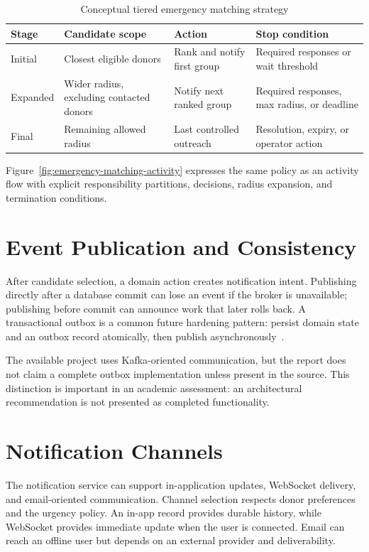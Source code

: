 \begin{table}[H]
\centering\small
\begin{tabularx}{\textwidth}{|P{2.3cm}|P{3.1cm}|Y|Y|}
\hline
{}\textbf{Stage} & \textbf{Candidate scope} & \textbf{Action} & \textbf{Stop condition}\\ \hline
Initial & Closest eligible donors & Rank and notify first group & Required responses or wait threshold\\ \hline
Expanded & Wider radius, excluding contacted donors & Notify next ranked group & Required responses, max radius, or deadline\\ \hline
Final & Remaining allowed radius & Last controlled outreach & Resolution, expiry, or operator action\\ \hline
\end{tabularx}
\caption{Conceptual tiered emergency matching strategy}
\label{tab:matching-tiers}
\end{table}

Figure~\ref{fig:emergency-matching-activity} expresses the same policy as an activity flow with explicit responsibility partitions, decisions, radius expansion, and termination conditions.


\section{Event Publication and Consistency}
After candidate selection, a domain action creates notification intent. Publishing directly after a database commit can lose an event if the broker is unavailable; publishing before commit can announce work that later rolls back. A transactional outbox is a common future hardening pattern: persist domain state and an outbox record atomically, then publish asynchronously~\cite{outbox}.

The available project uses Kafka-oriented communication, but the report does not claim a complete outbox implementation unless present in the source. This distinction is important in an academic assessment: an architectural recommendation is not presented as completed functionality.

\section{Notification Channels}
The notification service can support in-application updates, WebSocket delivery, and email-oriented communication. Channel selection respects donor preferences and the urgency policy. An in-app record provides durable history, while WebSocket provides immediate update when the user is connected. Email can reach an offline user but depends on an external provider and deliverability.

